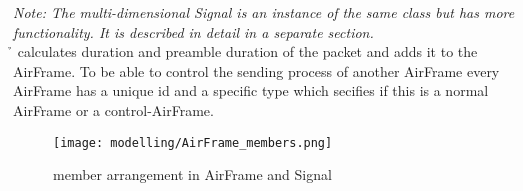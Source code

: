 \emph{Note: The multi-dimensional Signal is an instance of the same class but
has more functionality. It is described in detail in a separate section.}\\

\h{\bp} calculates duration and preamble
duration of the packet and adds it to the
AirFrame. 
To be able to control the sending process of another AirFrame
every AirFrame has a unique id and a specific type which secifies if this is a
normal AirFrame or a control-AirFrame.


\begin{figure}[H]
 \centering
 \texttt{[image: modelling/AirFrame\_members.png]}
 \caption{member arrangement in AirFrame and Signal}
 \label{fig:memberAirFrame}
\end{figure}
\newpage
